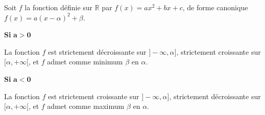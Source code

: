 \documentclass[11pt]{article}
\begin{document}
\begin{prop}
  Soit $f$ la fonction définie sur $\mathbb{R}$ par $f(x)=ax^2+bx+c$, de forme
  canonique $f(x)=a(x-\alpha)^2+\beta$.

  \noindent
  \begin{minipage}[t]{.47\textwidth}
    \begin{center}
      {\bf Si} $\mathbf{a>0}$\vspace{.2cm}

    \end{center}
  La fonction $f$ est strictement décroissante sur $]-\infty, \alpha]$,
  strictement croissante sur $[\alpha, +\infty[$, et $f$ admet comme minimum
    $\beta$ en $\alpha$.
    \begin{center}
    \end{center}
  \end{minipage}
    \hfill
  \begin{minipage}[t]{.47\textwidth}
    \begin{center}
      {\bf Si} $\mathbf{a<0}$\vspace{.2cm}

    \end{center}
  La fonction $f$ est strictement croissante sur $]-\infty, \alpha]$,
  strictement décroissante sur $[\alpha, +\infty[$, et $f$ admet comme maximum
    $\beta$ en $\alpha$.
    \begin{center}
    \end{center}
  \end{minipage}
\end{prop}
\end{document}
